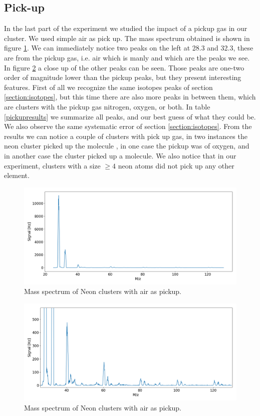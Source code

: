 \documentclass[a4paper,10pt]{article}
\begin{document}
\subsection{Pick-up}
In the last part of the experiment we studied the impact of a pickup gas in our cluster. We used simple air as pick up. The mass spectrum obtained is shown in figure \ref{pickup}. We can immediately notice two peaks on the left at 28.3 and 32.3, these are from the pickup gas, i.e. air which is manly  and  which are the peaks we see. In figure \ref{pickupzoom} a close up of the other peaks can be seen. Those peaks are one-two order of magnitude lower than the pickup peaks, but they present interesting features. First of all we recognize the same isotopes peaks of section \ref{section:isotopes}, but this time there are also more peaks in between them, which are clusters with the pickup gas nitrogen, oxygen, or both. In table \ref{pickupresults} we summarize all peaks, and our best guess of what they could be. We also observe the same systematic error of section \ref{section:isotopes}.
 From the results we can notice a couple of clusters with pick up gas, in two instances the neon cluster picked up the molecule , in one case the pickup was of oxygen, and in another case the cluster picked up a  molecule.
 We also notice that in our experiment, clusters with a size $\geq 4$ neon atoms did not pick up any other element.

\begin{figure}[H]
	\centering
	\includegraphics[width =\textwidth]{pickup}
	\caption{Mass spectrum of Neon clusters with air as pickup.}
	\label{pickup}
\end{figure}
\begin{figure}[H]
	\centering
	\includegraphics[width =\textwidth]{pickupzoom}
	\caption{Mass spectrum of Neon clusters with air as pickup.}
	\label{pickupzoom}
\end{figure}
\end{document}

